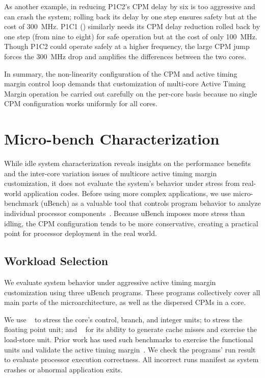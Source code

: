As another example, in  reducing P1C2's CPM delay by six is too aggressive and can crash the system; rolling back its delay by one step ensures safety but at the cost of 300~MHz. P1C1 () similarly needs its CPM delay reduction rolled back by one step (from nine to eight) for safe operation but at the cost of only 100~MHz. Though P1C2 could operate safely at a higher frequency, the large CPM jump forces the 300~MHz drop and amplifies the differences between the two cores.

In summary, the non-linearity configuration of the CPM and active timing margin control loop demands that customization of multi-core Active Timing Margin operation be carried out carefully on the per-core basis because no single CPM configuration works uniformly for all cores.

\section{Micro-bench Characterization}
\label{sec:process:ubench}



While idle system characterization reveals insights on the performance benefits and the inter-core variation issues of multicore active timing margin customization, it does not evaluate the system's behavior under stress from real-world application codes. Before using more complex applications, we use micro-benchmark (uBench) as a valuable tool that controls program behavior to analyze individual processor components~\cite{papadimitriou2018micro}. Because uBench imposes more stress than idling, the CPM configuration tends to be more conservative, creating a practical point for processor deployment in the real world.

\subsection{Workload Selection}
\label{sec:process:ubench_benchmarks}

We evaluate system behavior under aggressive active timing margin customization using three uBench programs. These programs collectively cover all main parts of the microarchitecture, as well as the dispersed CPMs in a core. 

We use ~\cite{coremark} to stress the core's control, branch, and integer units;  to stress the floating point unit; and ~\cite{stream} for its ability to generate cache misses and exercise the load-store unit. Prior work has used such benchmarks to exercise the functional units and validate the active timing margin~\cite{lefurgy2011active, lefurgy2013active}. We check the programs' run result to evaluate processor execution correctness. All incorrect runs manifest as system crashes or abnormal application exits.

